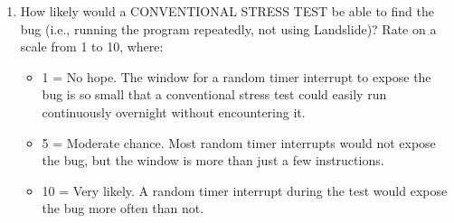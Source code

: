 \documentclass{article}
\begin{document}
\begin{enumerate}
\begin{itemize}
		\end{itemize}
		\vspace{0.5in}
	\item How likely would a CONVENTIONAL STRESS TEST be able to find the bug (i.e., running the program repeatedly, not using Landslide)? Rate on a scale from 1 to 10, where:
		\begin{itemize}
			\item 1 = No hope. The window for a random timer interrupt to expose the bug is so small that a conventional stress test could easily run continuously overnight without encountering it.
			\item 5 = Moderate chance. Most random timer interrupts would not expose the bug, but the window is more than just a few instructions.
			\item 10 = Very likely. A random timer interrupt during the test would expose the bug more often than not.
		\end{itemize}
\end{enumerate}
\end{document}
